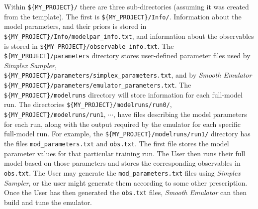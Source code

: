 \documentclass[UserManual.tex]{subfiles}
\begin{document}
Within {\tt \$\{MY\_PROJECT\}/} there are three sub-directories (assuming it was created from the template). The first is {\tt \$\{MY\_PROJECT\}/Info/}. Information about the model parameters, and their priors is stored in {\tt \$\{MY\_PROJECT\}/Info/modelpar\_info.txt}, and information about the observables is stored in {\tt \$\{MY\_PROJECT\}/observable\_info.txt}. The {\tt \$\{MY\_PROJECT\}/parameters} directory stores user-defined parameter files used by {\it Simplex Sampler},\\ {\tt \$\{MY\_PROJECT\}/parameters/simplex\_parameters.txt}, and by {\it Smooth Emulator}\\{\tt \$\{MY\_PROJECT\}/parameters/emulator\_parameters.txt}. The {\tt\$\{MY\_PROJECT\}/modelruns} directory will store information for each full-model run. The directories {\tt  \$\{MY\_PROJECT\}/modelruns/run0/}, {\tt  \$\{MY\_PROJECT\}/modelruns/run1}, $\cdots$, have files describing the model parameters for each run, along with the output required by the emulator for each specific full-model run. For example, the {\tt  \$\{MY\_PROJECT\}/modelruns/run1/} directory has the files {\tt mod\_parameters.txt} and {\tt obs.txt}. The first file stores the model parameter values for that particular training run. The User then runs their full model based on those parameters and stores the corresponding observables in {\tt obs.txt}. The User may generate the {\tt mod\_parameters.txt} files using {\it Simplex Sampler}, or the user might generate them according to some other prescription. Once the User has then generated the {\tt obs.txt} files, {\it Smooth Emulator} can then build and tune the emulator.
\end{document}
